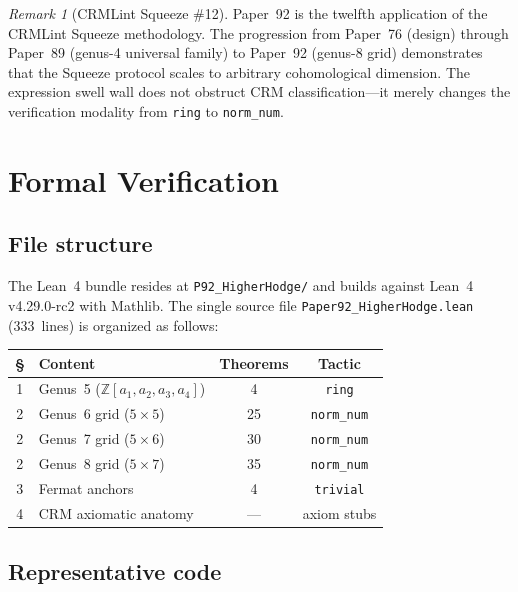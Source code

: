 \documentclass[11pt]{article}
\theoremstyle{plain}
\theoremstyle{definition}
\theoremstyle{remark}
\newtheorem{remark}[theorem]{Remark}
\newcommand{\ZZ}{\mathbb{Z}}
\begin{document}
\begin{remark}[CRMLint Squeeze \#12]
Paper~92 is the twelfth application of the CRMLint Squeeze methodology.
The progression from Paper~76 (design) through Paper~89 (genus-4
universal family) to Paper~92 (genus-8 grid) demonstrates that the
Squeeze protocol scales to arbitrary cohomological dimension.
The expression swell wall does not obstruct CRM classification---it
merely changes the verification modality from \texttt{ring} to
\texttt{norm\_num}.
\end{remark}

\section{Formal Verification}
\label{sec:lean}

\subsection{File structure}

The Lean~4 bundle resides at \texttt{P92\_HigherHodge/} and builds
against Lean~4 v4.29.0-rc2 with Mathlib.  The single source file
\texttt{Paper92\_HigherHodge.lean} (333~lines) is organized as follows:

\begin{center}
\begin{tabular}{clcc}
\toprule
\textbf{\S} & \textbf{Content} & \textbf{Theorems} & \textbf{Tactic} \\
\midrule
1 & Genus~5 ($\ZZ[a_1,a_2,a_3,a_4]$) & 4 & \texttt{ring} \\
2 & Genus~6 grid ($5 \times 5$) & 25 & \texttt{norm\_num} \\
2 & Genus~7 grid ($5 \times 6$) & 30 & \texttt{norm\_num} \\
2 & Genus~8 grid ($5 \times 7$) & 35 & \texttt{norm\_num} \\
3 & Fermat anchors & 4 & \texttt{trivial} \\
4 & CRM axiomatic anatomy & --- & axiom stubs \\
\bottomrule
\end{tabular}
\end{center}

\subsection{Representative code}
\end{document}
